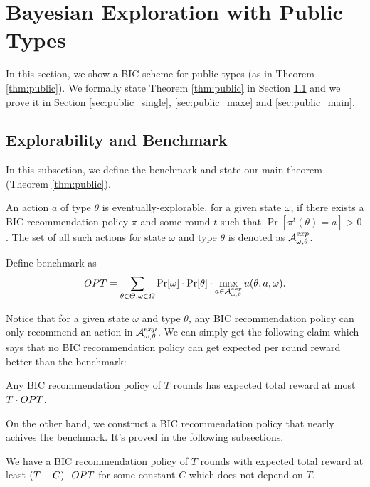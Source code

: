 
\section{Bayesian Exploration with Public Types}
\label{sec:public}
In this section, we show a BIC scheme for public types (as in Theorem \ref{thm:public}). We formally state Theorem \ref{thm:public} in Section \ref{sec:public_bench} and we prove it in Section \ref{sec:public_single}, \ref{sec:public_maxe} and \ref{sec:public_main}.

\subsection{Explorability and Benchmark}
\label{sec:public_bench}
In this subsection, we define the benchmark and state our main theorem (Theorem \ref{thm:public}). 

\begin{definition}
\label{def:public_exp}
An action $a$ of type $\theta$ is eventually-explorable, for a given state $\omega$, if there exists a BIC recommendation policy $\pi$ and some round $t$ such that $\Pr[\pi^t(\theta)= a]> 0$. The set of all such actions for state $\omega$ and type $\theta$ is denoted as $\mathcal{A}_{\omega,\theta}^{exp}$.
\end{definition}

\begin{definition}[Benchmark]
Define benchmark as 
\[
OPT = \sum_{\theta \in \varTheta, \omega\in \varOmega} \Pr[\omega] \cdot \Pr[\theta] \cdot \max_{a \in \mathcal{A}_{\omega,\theta}^{exp}} u(\theta, a, \omega).
\]
\end{definition}

Notice that for a given state $\omega$ and type $\theta$, any BIC recommendation policy can only recommend an action in $\mathcal{A}_{\omega,\theta}^{exp}$. We can simply get the following claim which says that no BIC recommendation policy can get expected per round reward better than the benchmark:
\begin{claim}
Any BIC recommendation policy of $T$ rounds has expected total reward at most $T \cdot OPT$.  
\end{claim}

On the other hand, we construct a BIC recommendation policy that nearly achives the benchmark. It's proved in the following subsections.
\begin{theorem}
\label{thm:public}
We have a BIC recommendation policy of $T$ rounds with expected total reward at least $\left(T - C \right) \cdot OPT$ for some constant $C$ which does not depend on $T$. 
\end{theorem}

